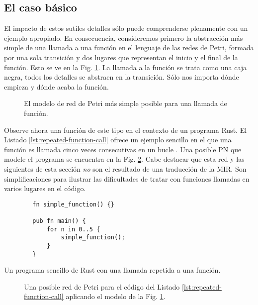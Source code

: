 \subsection{El caso básico}

El impacto de estos sutiles detalles sólo puede comprenderse plenamente con un ejemplo
apropiado. En consecuencia, consideremos primero la abstracción más simple de una llamada a una
función en el lenguaje de las redes de Petri, formada por una sola transición y dos lugares que
representan el inicio y el final de la función.
Esto se ve en la Fig. \ref{fig:simplest-function}.
La llamada a la función se trata como una caja negra, todos los
detalles se abstraen en la transición. Sólo nos importa dónde empieza y dónde acaba la
función.

\begin{figure}[!htb]
    \centering
    
    \caption{El modelo de red de Petri más simple posible para una llamada de función.}
    \label{fig:simplest-function}
\end{figure}

Observe ahora una función de este tipo en el contexto de un programa Rust.
El Listado \ref{lst:repeated-function-call} ofrece un ejemplo sencillo
en el que una función es llamada cinco veces consecutivas en un bucle .
Una posible \acrshort{PN} que modele el programa se encuentra en la Fig. \ref{fig:repeated-function-call}.
Cabe destacar que esta red y las siguientes de esta sección \emph{no} son el resultado de una traducción de la MIR.
Son simplificaciones para ilustrar las dificultades de tratar con funciones llamadas en varios
lugares en el código.

\begin{listing}[!htb]
    \begin{verbatim}
        fn simple_function() {}

        pub fn main() {
            for n in 0..5 {
                simple_function();
            }
        }
    \end{verbatim}
    \caption{Un programa sencillo de Rust con una llamada repetida a una función.}
    \label{lst:repeated-function-call}
\end{listing}

\begin{figure}[!htb]
    \centering
    
    \caption{Una posible red de Petri para el código del Listado \ref{lst:repeated-function-call}
        aplicando el modelo de la Fig. \ref{fig:simplest-function}.}
    \label{fig:repeated-function-call}
\end{figure}

